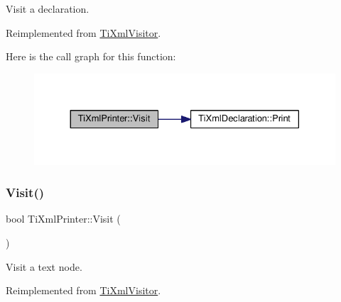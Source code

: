 Visit a declaration. 



Reimplemented from \hyperlink{class_ti_xml_visitor_afad71c71ce6473fb9b4b64cd92de4a19}{Ti\+Xml\+Visitor}.

Here is the call graph for this function\+:
\nopagebreak
\begin{figure}[H]
\begin{center}
\leavevmode
\includegraphics[width=330pt]{class_ti_xml_printer_adaf7eec4dc43ad071ff52b60361574f5_cgraph}
\end{center}
\end{figure}
\mbox{\label{class_ti_xml_printer_a0857c5d32c59b9a257f9a49cb9411df5}} 
\subsubsection{\texorpdfstring{Visit()}{Visit()}\hspace{0.1cm}{\footnotesize\ttfamily [2/4]}}
{\footnotesize\ttfamily bool Ti\+Xml\+Printer\+::\+Visit (\begin{DoxyParamCaption}\item[{const \hyperlink{class_ti_xml_text}{Ti\+Xml\+Text} \&}]{ }\end{DoxyParamCaption})\hspace{0.3cm}{\ttfamily [virtual]}}



Visit a text node. 



Reimplemented from \hyperlink{class_ti_xml_visitor_a399b8ebca5cd14664974a32d2ce029e5}{Ti\+Xml\+Visitor}.

